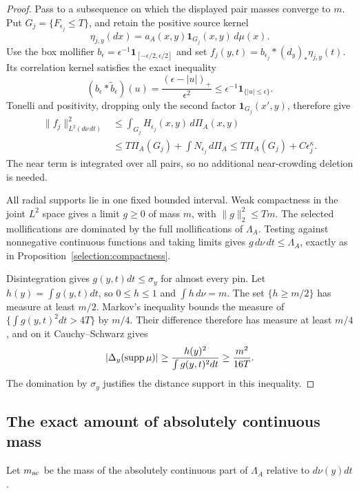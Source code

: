 \begin{proof}
Pass to a subsequence on which the displayed pair masses converge to
\(m\). Put \(G_j=\{F_{\epsilon_j}\le T\}\), and retain the positive
source kernel
\[
 \eta_{j,y}(dx)=a_A(x,y)\mathbf1_{G_j}(x,y)\,d\mu(x).
\]
Use the box mollifier
\(b_\epsilon=\epsilon^{-1}\mathbf1_{[-\epsilon/2,\epsilon/2]}\)
and set \(f_j(y,t)=b_{\epsilon_j}*(d_y)_*\eta_{j,y}(t)\).
Its correlation kernel satisfies the exact inequality
\[
 (b_\epsilon*\widetilde b_\epsilon)(u)
 =\frac{(\epsilon-|u|)_+}{\epsilon^2}
 \le\epsilon^{-1}\mathbf1_{\{|u|\le\epsilon\}}.
\]
Tonelli and positivity, dropping only the second factor
\(\mathbf1_{G_j}(x',y)\), therefore give
\begin{align*}
 \|f_j\|_{L^2(d\nu\,dt)}^2
 &\le\int_{G_j}H_{\epsilon_j}(x,y)\,d\Pi_A(x,y)\\
 &\le T\Pi_A(G_j)+\int N_{\epsilon_j}\,d\Pi_A
 \le T\Pi_A(G_j)+C\epsilon_j^\kappa.
\end{align*}
The near term is integrated over all pairs, so no additional near-crowding
deletion is needed.

All radial supports lie in one fixed bounded interval. Weak compactness in
the joint \(L^2\) space gives a limit \(g\ge0\) of mass \(m\), with
\(\|g\|_2^2\le Tm\). The selected mollifications are dominated by
the full mollifications of \(\Lambda_A\). Testing against nonnegative
continuous functions and taking limits gives
\(g\,d\nu\,dt\le\Lambda_A\), exactly as in
Proposition~\ref{selection:compactness}.

Disintegration gives \(g(y,t)dt\le\sigma_y\) for almost every pin.
Let \(h(y)=\int g(y,t)dt\), so \(0\le h\le1\) and \(\int h\,d\nu=m\).
The set \(\{h\ge m/2\}\) has measure at least \(m/2\).
Markov's inequality bounds the measure of
\(\{\int g(y,t)^2dt>4T\}\) by \(m/4\).
Their difference therefore has measure at least \(m/4\), and on it
Cauchy--Schwarz gives
\[
 |\Delta_y(\operatorname{supp}\mu)|
 \ge\frac{h(y)^2}{\int g(y,t)^2dt}
 \ge\frac{m^2}{16T}.
\]
The domination by \(\sigma_y\) justifies the distance support in this
inequality.
\end{proof}

\subsection{The exact amount of absolutely continuous mass}

Let \(m_{\rm ac}\) be the mass of the absolutely continuous part of
\(\Lambda_A\) relative to \(d\nu(y)dt\).

